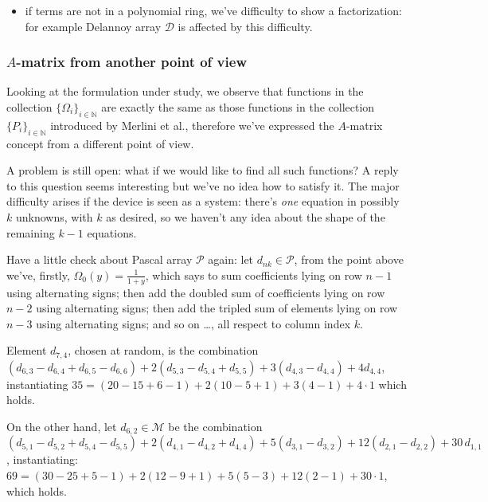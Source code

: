 \begin{itemize}
        \item if terms are not in a polynomial ring, we've difficulty to show a
        factorization: for example Delannoy array $\mathcal{D}$ is affected by this difficulty.

    \end{itemize}

\subsubsection{$A$-matrix from another point of view}

Looking at the formulation under study, we observe that functions
in the collection $\lbrace\Omega_{i}\rbrace_{i\in\mathbb{N}}$ 
are exactly the same as those functions in the collection 
$\lbrace P_{i}\rbrace_{i\in\mathbb{N}}$ 
introduced by Merlini et al., therefore we've expressed
the $A$-matrix concept from a different point of view. 

A problem is still open: what if we would like to find all such functions? A reply
to this question seems interesting but we've no idea how to satisfy it.
The major difficulty arises if the device is seen as a system:
there's \emph{one} equation in possibly $k$ unknowns, with $k$ as desired, 
so we haven't any idea about the shape of the remaining $k-1$ equations.

Have a little check about Pascal array $\mathcal{P}$ again:
let $d_{nk}\in\mathcal{P}$, from the point above we've, firstly,
$\Omega_{0}(y)=\frac{1}{1+y}$, which says to sum coefficients
lying on row $n-1$ using alternating signs; then add the doubled sum of
coefficients lying on row $n-2$ using alternating signs; 
then add the tripled sum of elements lying on row $n-3$ 
using alternating signs; and so on \ldots, all respect to column index $k$. 

Element $d_{7,4}$, chosen at random, is the combination 
    $(d_{6,3}-d_{6,4}+d_{6,5}-d_{6,6})+
    2(d_{5,3}-d_{5,4}+d_{5,5}) + 3(d_{4,3}-d_{4,4}) + 4d_{4,4}$, 
    instantiating $35 = (20-15+6-1)+2(10-5+1)+3(4-1)+4\cdot1$
     which holds.

On the other hand, let $d_{6,2}\in\mathcal{M}$ be the
combination $(d_{5,1}-d_{5,2}+d_{5,4}-d_{5,5})
    +2(d_{4,1}-d_{4,2}+d_{4,4})
    +5(d_{3,1}-d_{3,2})
    +12(d_{2,1} -d_{2,2})
    +30\,d_{1,1}$, instantiating: 
    $69=(30-25+5-1)
    +2(12-9+1)
    +5(5-3)
    +12(2 -1)
    +30\cdot1$, which holds.

